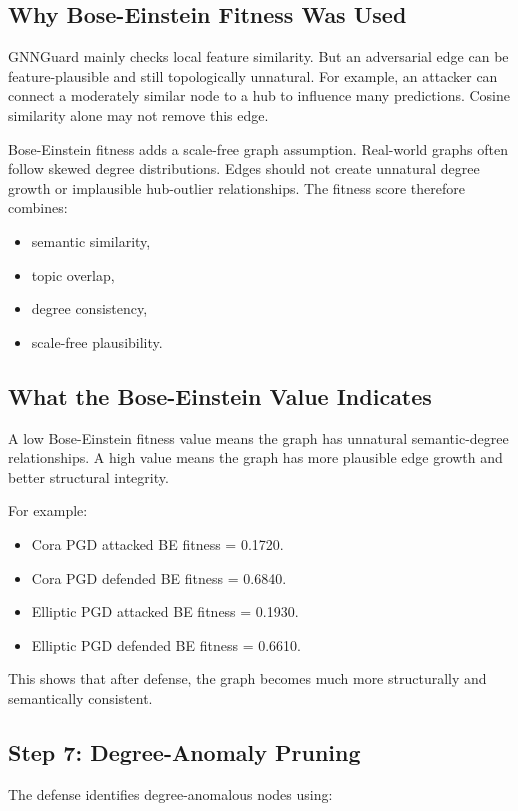 \documentclass[12pt,a4paper]{article}
\begin{document}
\subsection{Why Bose-Einstein Fitness Was Used}
GNNGuard mainly checks local feature similarity. But an adversarial edge can be feature-plausible and still topologically unnatural. For example, an attacker can connect a moderately similar node to a hub to influence many predictions. Cosine similarity alone may not remove this edge.

Bose-Einstein fitness adds a scale-free graph assumption. Real-world graphs often follow skewed degree distributions. Edges should not create unnatural degree growth or implausible hub-outlier relationships. The fitness score therefore combines:

\begin{itemize}
    \item semantic similarity,
    \item topic overlap,
    \item degree consistency,
    \item scale-free plausibility.
\end{itemize}

\subsection{What the Bose-Einstein Value Indicates}
A low Bose-Einstein fitness value means the graph has unnatural semantic-degree relationships. A high value means the graph has more plausible edge growth and better structural integrity.

For example:

\begin{itemize}
    \item Cora PGD attacked BE fitness = 0.1720.
    \item Cora PGD defended BE fitness = 0.6840.
    \item Elliptic PGD attacked BE fitness = 0.1930.
    \item Elliptic PGD defended BE fitness = 0.6610.
\end{itemize}

This shows that after defense, the graph becomes much more structurally and semantically consistent.

\subsection{Step 7: Degree-Anomaly Pruning}
The defense identifies degree-anomalous nodes using:
\end{document}
